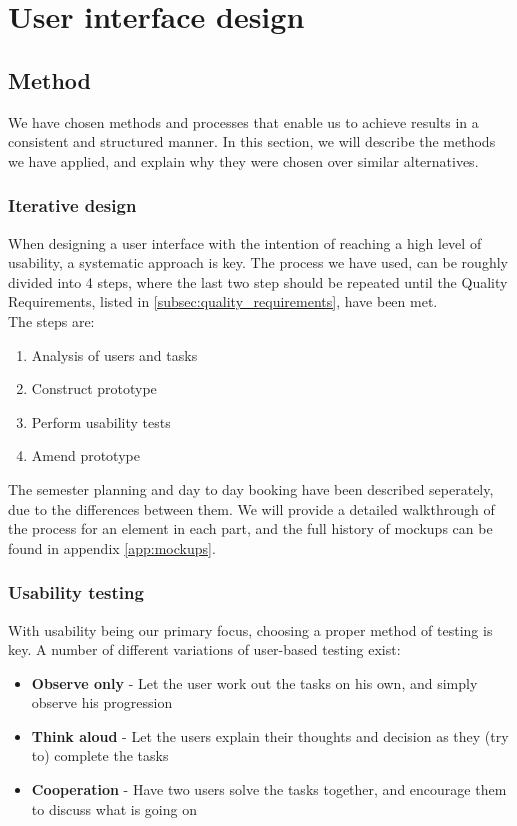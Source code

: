 \chapter{User interface design}
\label{chap:user_interface_design}
\section{Method}
\label{sec:method}
We have chosen methods and processes that enable us to achieve results in a consistent and structured manner. In this section, we will describe the methods we have applied, and explain why they were chosen over similar alternatives.

\subsection{Iterative design}
When designing a user interface with the intention of reaching a high level of usability, a systematic approach is key. The process we have used, can be roughly divided into 4 steps, where the last two step should be repeated until the Quality Requirements, listed in \ref{subsec:quality_requirements}, have been met. \cite{lauesen} \\

The steps are:
\begin{enumerate}
\item Analysis of users and tasks
\item Construct prototype
\item Perform usability tests
\item Amend prototype 
\end{enumerate}

The semester planning and day to day booking have been described seperately, due to the differences between them. We will provide a detailed walkthrough of the process for an element in each part, and the full history of mockups can be found in appendix \ref{app:mockups}.

\subsection{Usability testing}
\label{sec:usability_testing}
With usability being our primary focus, choosing a proper method of testing is key. A number of different variations of user-based testing exist:\cite{lauesen}
\begin{itemize}
\item \textbf{Observe only} - Let the user work out the tasks on his own, and simply observe his progression
\item \textbf{Think aloud} - Let the users explain their thoughts and decision as they (try to) complete the tasks
\item \textbf{Cooperation} - Have two users solve the tasks together, and encourage them to discuss what is going on
\end{itemize}

